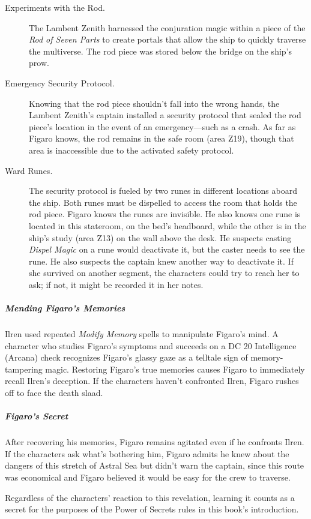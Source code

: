 \documentclass[10pt,a4paper,twoside,bg=print,twocolumn,openany,nodeprecatedcode]{dndbook}
\begin{document}
\begin{description}
\item[Experiments with the Rod.]
The Lambent Zenith harnessed the conjuration magic within a piece of the \textit{Rod of Seven Parts} to create portals that allow the ship to quickly traverse the multiverse. The rod piece was stored below the bridge on the ship's prow.
\item[Emergency Security Protocol.]
Knowing that the rod piece shouldn't fall into the wrong hands, the Lambent Zenith's captain installed a security protocol that sealed the rod piece's location in the event of an emergency—such as a crash. As far as Figaro knows, the rod remains in the safe room (area Z19), though that area is inaccessible due to the activated safety protocol.
\item[Ward Runes.]
The security protocol is fueled by two runes in different locations aboard the ship. Both runes must be dispelled to access the room that holds the rod piece. Figaro knows the runes are invisible. He also knows one rune is located in this stateroom, on the bed's headboard, while the other is in the ship's study (area Z13) on the wall above the desk. He suspects casting \textit{Dispel Magic} on a rune would deactivate it, but the caster needs to see the rune. He also suspects the captain knew another way to deactivate it. If she survived on another segment, the characters could try to reach her to ask; if not, it might be recorded it in her notes.
\end{description}

\subparagraph{Mending Figaro's Memories}
Ilren used repeated \textit{Modify Memory} spells to manipulate Figaro's mind. A character who studies Figaro's symptoms and succeeds on a DC 20 Intelligence (Arcana) check recognizes Figaro's glassy gaze as a telltale sign of memory-tampering magic. Restoring Figaro's true memories causes Figaro to immediately recall Ilren's deception. If the characters haven't confronted Ilren, Figaro rushes off to face the death slaad.

\subparagraph{Figaro's Secret}
After recovering his memories, Figaro remains agitated even if he confronts Ilren. If the characters ask what's bothering him, Figaro admits he knew about the dangers of this stretch of Astral Sea but didn't warn the captain, since this route was economical and Figaro believed it would be easy for the crew to traverse.

Regardless of the characters' reaction to this revelation, learning it counts as a secret for the purposes of the Power of Secrets rules in this book's introduction.
\end{document}
